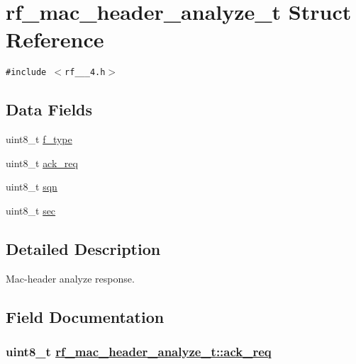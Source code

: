 \hypertarget{structrf__mac__header__analyze__t}{
\section{rf\_\-mac\_\-header\_\-analyze\_\-t Struct Reference}
\label{structrf__mac__header__analyze__t}
}
{\tt \#include $<$rf\_\_\_\-4.h$>$}

\subsection*{Data Fields}
\begin{CompactItemize}
\item 
uint8\_\-t \hyperlink{structrf__mac__header__analyze__t_cdea55dd9662076c530db418e501a4b3}{f\_\-type}
\item 
uint8\_\-t \hyperlink{structrf__mac__header__analyze__t_4fe82df93230eef5db2a4f335f726e52}{ack\_\-req}
\item 
uint8\_\-t \hyperlink{structrf__mac__header__analyze__t_9697d7e7a2305dccac3af80253c02894}{sqn}
\item 
uint8\_\-t \hyperlink{structrf__mac__header__analyze__t_101f756d24f219d91e70d6f2f402e0d3}{sec}
\end{CompactItemize}


\subsection{Detailed Description}
Mac-header analyze response. 



\subsection{Field Documentation}
\hypertarget{structrf__mac__header__analyze__t_4fe82df93230eef5db2a4f335f726e52}{
\subsubsection[ack\_\-req]{\setlength{\rightskip}{0pt plus 5cm}uint8\_\-t \hyperlink{structrf__mac__header__analyze__t_4fe82df93230eef5db2a4f335f726e52}{rf\_\-mac\_\-header\_\-analyze\_\-t::ack\_\-req}}}
\label{structrf__mac__header__analyze__t_4fe82df93230eef5db2a4f335f726e52}


